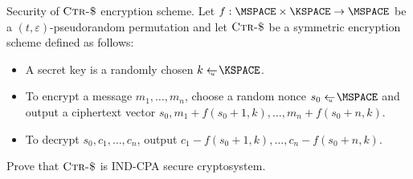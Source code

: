 \documentclass{crypto-exercise}
\author{Sven Laur}
\newcommand{\CTRS}{\textsc{Ctr-\$}}
\begin{document}
\begin{exercise}{Security of $\CTRS$ encryption scheme.} 
Let $f:\MSPACE\times\KSPACE\to\MSPACE$ be a $(t,
\varepsilon)$-pseudorandom permutation and let $\CTRS$ be a symmetric
encryption scheme defined as follows:
\begin{itemize}
\item A secret key is a randomly chosen $k\getsu\KSPACE$.
\item To encrypt a message $m_1,\ldots,m_n$, choose a random nonce
  $s_0\getsu\MSPACE$ and output a ciphertext vector
  $s_0,m_1+f(s_0+1,k),\ldots, m_n+f(s_0+n,k)$.
\item To decrypt $s_0,c_1,\ldots,c_n$, output
  $c_1-f(s_0+1,k),\ldots,c_n-f(s_0+n,k)$.
\end{itemize}
Prove that $\CTRS$ is IND-CPA secure cryptosystem.
\end{exercise}
\end{document}
